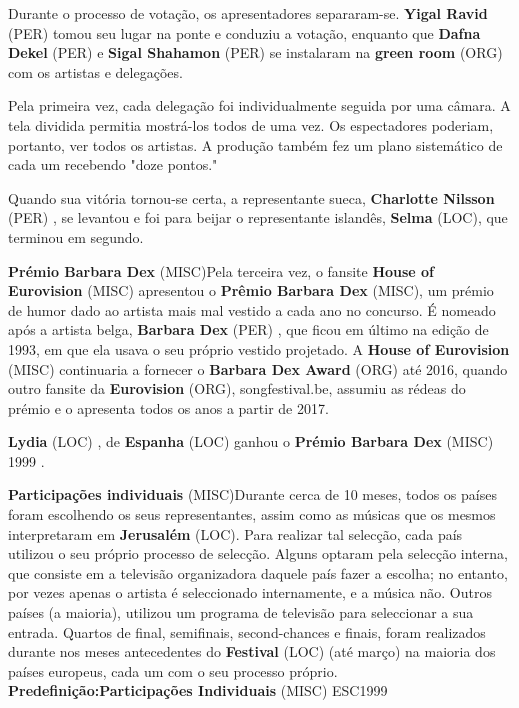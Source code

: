 \documentclass[12pt,a4paper]{article}
\begin{document}
Durante o processo de votação, os apresentadores separaram-se. \textbf{Yigal Ravid} (PER) tomou seu lugar na ponte e conduziu a votação, enquanto que \textbf{Dafna Dekel} (PER) e \textbf{Sigal Shahamon} (PER) se instalaram na \textbf{green room} (ORG) com os artistas e delegações.

Pela primeira vez, cada delegação foi individualmente seguida por uma câmara. A tela dividida permitia mostrá-los todos de uma vez. Os espectadores poderiam, portanto, ver todos os artistas. A produção também fez um plano sistemático de cada um recebendo "doze pontos."

Quando sua vitória tornou-se certa, a representante sueca, \textbf{Charlotte Nilsson} (PER) , se levantou e foi para beijar o representante islandês, \textbf{Selma} (LOC), que terminou em segundo.



\textbf{Prémio Barbara Dex} (MISC)Pela terceira vez, o fansite \textbf{House of Eurovision} (MISC) apresentou o \textbf{Prêmio Barbara Dex} (MISC), um prémio de humor dado ao artista mais mal vestido a cada ano no concurso. É nomeado após a artista belga, \textbf{Barbara Dex} (PER) , que ficou em último na edição de 1993, em que ela usava o seu próprio vestido projetado. A \textbf{House of Eurovision} (MISC) continuaria a fornecer o \textbf{Barbara Dex Award} (ORG) até 2016, quando outro fansite da \textbf{Eurovision} (ORG), songfestival.be, assumiu as rédeas do prémio e o apresenta todos os anos a partir de 2017.

\textbf{Lydia} (LOC) , de \textbf{Espanha} (LOC) ganhou o \textbf{Prémio Barbara Dex} (MISC) 1999 .



\textbf{Participações individuais} (MISC)Durante cerca de 10 meses, todos os países foram escolhendo os seus representantes, assim como as músicas que os mesmos interpretaram em \textbf{Jerusalém} (LOC). Para realizar tal selecção, cada país utilizou o seu próprio processo de selecção. Alguns optaram pela selecção interna, que consiste em a televisão organizadora daquele país fazer a escolha; no entanto, por vezes apenas o artista é seleccionado internamente, e a música não. Outros países (a maioria), utilizou um programa de televisão para seleccionar a sua entrada. Quartos de final, semifinais, second-chances e finais, foram realizados durante nos meses antecedentes do \textbf{Festival} (LOC) (até março) na maioria dos países europeus, cada um com o seu processo próprio. \textbf{Predefinição:Participações Individuais} (MISC) ESC1999
\end{document}
